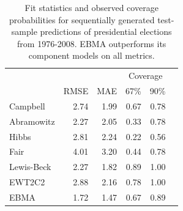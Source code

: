 \documentclass[12pt,fullpage,endnotes]{article}
\begin{document}
\begin{table}[h!]
  \caption{\footnotesize Fit statistics and observed coverage
    probabilities for sequentially generated test-sample predictions
    of presidential elections from 1976-2008.  EBMA outperforms its
    component models on all metrics.}
\label{Pres-Res} \small
\begin{center}
\begin{tabular}{lrrrrr}
\toprule
                        &              &              & \multicolumn{2}{c}{Coverage} \\ 
                    	&	RMSE&	MAE	&67\% &   90\%      \\
\midrule
Campbell & 2.74 & 1.99 & 0.67 & 0.78 \\ 
  Abramowitz & 2.27 & 2.05 & 0.33 & 0.78 \\ 
  Hibbs & 2.81 & 2.24 & 0.22 & 0.56 \\ 
  Fair & 4.01 & 3.20 & 0.44 & 0.78 \\ 
  Lewis-Beck & 2.27 & 1.82 & 0.89 & 1.00 \\ 
  EWT2C2 & 2.88 & 2.16 & 0.78 & 1.00 \\ 
  EBMA & 1.72 & 1.47 & 0.67 & 0.89 \\
\bottomrule
\end{tabular}
\end{center}
\end{table}
\end{document}

